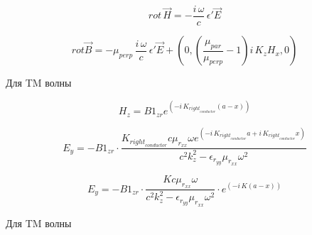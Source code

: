 \documentclass[11pt]{article}
\begin{document}
\[rot\,\vec{H} = - \frac{i\,\omega}{c} \, \epsilon' \vec{E}\]

\[rot \vec B = - \mu_{perp} \, \frac{i\,\omega}{c} \, \epsilon' \vec{E} + \left(0,\left(\frac{\mu_{par}}{\mu_{perp}}-1\right)i\,K_z {H_x}, 0\right)\]




    Для TM волны

\[H_z = \mathit{B1}_{\mathit{zr}} e^{\left(-i \, K_{\mathit{right}_{\mathit{conductor}}} {\left(a - x\right)}\right)}\]

    \[E_y = -\mathit{B1}_{\mathit{zr}} \cdot \frac{ K_{\mathit{right}_{\mathit{conductor}}} c \mu_{r_{\mathit{xx}}} \omega e^{\left(-i \, K_{\mathit{right}_{\mathit{conductor}}} a + i \, K_{\mathit{right}_{\mathit{conductor}}} x\right)}}{c^{2} k_{z}^{2} - \epsilon_{r_{\mathit{yy}}} \mu_{r_{\mathit{xx}}} \omega^{2}}\]

    \[E_y = -\mathit{B1}_{\mathit{zr}} \cdot \frac{ K c \mu_{r_{\mathit{xx}}} \omega }{c^{2} k_{z}^{2} - \epsilon_{r_{\mathit{yy}}} \mu_{r_{\mathit{xx}}} \omega^{2}} \cdot e^{\left(-i \, K {\left(a - x\right)}\right)}\]

    Для TM волны
\end{document}

